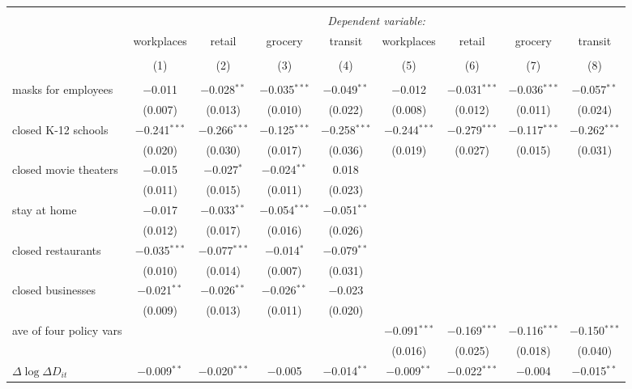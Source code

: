 \begin{tabular}{@{\extracolsep{1pt}}lcccccccc} 
\\[-1.8ex]\hline 
\hline \\[-1.8ex] 
 & \multicolumn{8}{c}{\textit{Dependent variable:}} \\ 
\cline{2-9} 
 & workplaces & retail & grocery & transit & workplaces & retail & grocery & transit \\ 
\\[-1.8ex] & (1) & (2) & (3) & (4) & (5) & (6) & (7) & (8)\\ 
\hline \\[-1.8ex] 
 masks for employees & $-$0.011 & $-$0.028$^{**}$ & $-$0.035$^{***}$ & $-$0.049$^{**}$ & $-$0.012 & $-$0.031$^{***}$ & $-$0.036$^{***}$ & $-$0.057$^{**}$ \\ 
  & (0.007) & (0.013) & (0.010) & (0.022) & (0.008) & (0.012) & (0.011) & (0.024) \\ 
  closed K-12 schools & $-$0.241$^{***}$ & $-$0.266$^{***}$ & $-$0.125$^{***}$ & $-$0.258$^{***}$ & $-$0.244$^{***}$ & $-$0.279$^{***}$ & $-$0.117$^{***}$ & $-$0.262$^{***}$ \\ 
  & (0.020) & (0.030) & (0.017) & (0.036) & (0.019) & (0.027) & (0.015) & (0.031) \\ 
  closed movie theaters & $-$0.015 & $-$0.027$^{*}$ & $-$0.024$^{**}$ & 0.018 &  &  &  &  \\ 
  & (0.011) & (0.015) & (0.011) & (0.023) &  &  &  &  \\ 
  stay at home & $-$0.017 & $-$0.033$^{**}$ & $-$0.054$^{***}$ & $-$0.051$^{**}$ &  &  &  &  \\ 
  & (0.012) & (0.017) & (0.016) & (0.026) &  &  &  &  \\ 
  closed restaurants & $-$0.035$^{***}$ & $-$0.077$^{***}$ & $-$0.014$^{*}$ & $-$0.079$^{**}$ &  &  &  &  \\ 
  & (0.010) & (0.014) & (0.007) & (0.031) &  &  &  &  \\ 
  closed businesses & $-$0.021$^{**}$ & $-$0.026$^{**}$ & $-$0.026$^{**}$ & $-$0.023 &  &  &  &  \\ 
  & (0.009) & (0.013) & (0.011) & (0.020) &  &  &  &  \\ 
  ave of four policy vars &  &  &  &  & $-$0.091$^{***}$ & $-$0.169$^{***}$ & $-$0.116$^{***}$ & $-$0.150$^{***}$ \\ 
  &  &  &  &  & (0.016) & (0.025) & (0.018) & (0.040) \\ 
  $\Delta \log \Delta D_{it}$ & $-$0.009$^{**}$ & $-$0.020$^{***}$ & $-$0.005 & $-$0.014$^{**}$ & $-$0.009$^{**}$ & $-$0.022$^{***}$ & $-$0.004 & $-$0.015$^{**}$ \\ 

\end{tabular}
